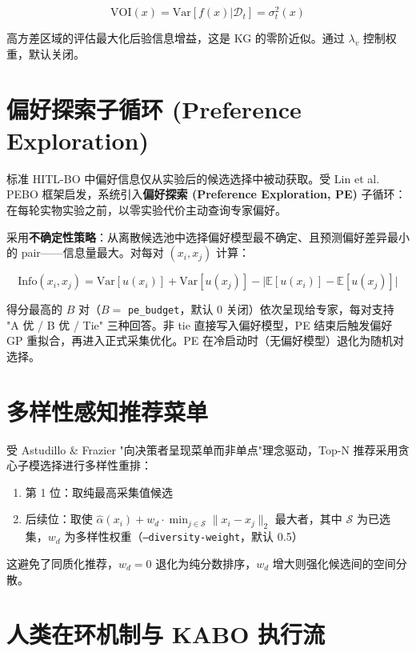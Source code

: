 \documentclass[12pt,a4paper]{article}
\begin{document}
\begin{equation}
    \text{VOI}(x) = \text{Var}[f(x) | \mathcal{D}_t] = \sigma_{t}^2(x)
\end{equation}

高方差区域的评估最大化后验信息增益，这是 KG 的零阶近似。通过 $\lambda_v$ 控制权重，默认关闭。


\section{偏好探索子循环 (Preference Exploration)}

标准 HITL-BO 中偏好信息仅从实验后的候选选择中被动获取。受 Lin et al.\cite{lin2022pebo} PEBO 框架启发，系统引入\textbf{偏好探索 (Preference Exploration, PE)} 子循环：在每轮实物实验之前，以零实验代价主动查询专家偏好。

采用\textbf{不确定性策略}：从离散候选池中选择偏好模型最不确定、且预测偏好差异最小的 pair——信息量最大。对每对 $(x_i, x_j)$ 计算：

\begin{equation}
    \text{Info}(x_i, x_j) = \text{Var}[u(x_i)] + \text{Var}[u(x_j)] - \bigl|\mathbb{E}[u(x_i)] - \mathbb{E}[u(x_j)]\bigr|
\end{equation}

得分最高的 $B$ 对（$B = $ \texttt{pe\_budget}，默认 0 关闭）依次呈现给专家，每对支持 "A 优 / B 优 / Tie" 三种回答。非 tie 直接写入偏好模型，PE 结束后触发偏好 GP 重拟合，再进入正式采集优化。PE 在冷启动时（无偏好模型）退化为随机对选择。


\section{多样性感知推荐菜单}

受 Astudillo \& Frazier\cite{astudillo2019} "向决策者呈现菜单而非单点"理念驱动，Top-N 推荐采用贪心子模选择进行多样性重排：

\begin{enumerate}
    \item 第 1 位：取纯最高采集值候选
    \item 后续位：取使 $\hat{\alpha}(x_i) + w_d \cdot \min_{j \in \mathcal{S}} \|x_i - x_j\|_2$ 最大者，其中 $\mathcal{S}$ 为已选集，$w_d$ 为多样性权重（\texttt{--diversity-weight}，默认 0.5）
\end{enumerate}

这避免了同质化推荐，$w_d = 0$ 退化为纯分数排序，$w_d$ 增大则强化候选间的空间分散。


\section{人类在环机制与 KABO 执行流}
\end{document}
